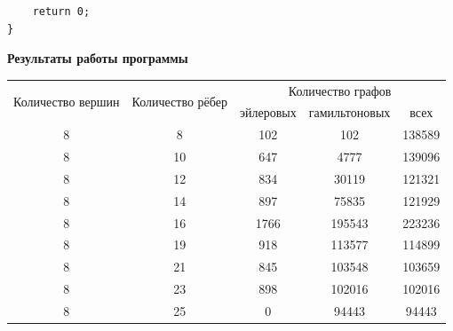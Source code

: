 \documentclass[a4paper,14pt]{extarticle}
\begin{document}
\begin{enumerate}[1.]
\begin{verbatim}
    return 0;
}
\end{verbatim}
          \begin{center}\textbf{Результаты работы программы}\end{center}
          \begin{tabular}{|c|c|c|c|c|}
              \hline
              \multirow{2}{*}{Количество вершин} & \multirow{2}{*}{Количество рёбер} & \multicolumn{3}{|c|}{Количество графов}                          \\
              \cline{3-5}
                                                 &                                   & эйлеровых                               & гамильтоновых & всех   \\
              \hline
              8                                  & 8                                 & 102                                     & 102           & 138589 \\
              \hline
              8                                  & 10                                & 647                                     & 4777          & 139096 \\
              \hline
              8                                  & 12                                & 834                                     & 30119         & 121321 \\
              \hline
              8                                  & 14                                & 897                                     & 75835         & 121929 \\
              \hline
              8                                  & 16                                & 1766                                    & 195543        & 223236 \\
              \hline
              8                                  & 19                                & 918                                     & 113577        & 114899 \\
              \hline
              8                                  & 21                                & 845                                     & 103548        & 103659 \\
              \hline
              8                                  & 23                                & 898                                     & 102016        & 102016 \\
              \hline
              8                                  & 25                                & 0                                       & 94443         & 94443  \\

\end{tabular}
\end{enumerate}
\end{document}
